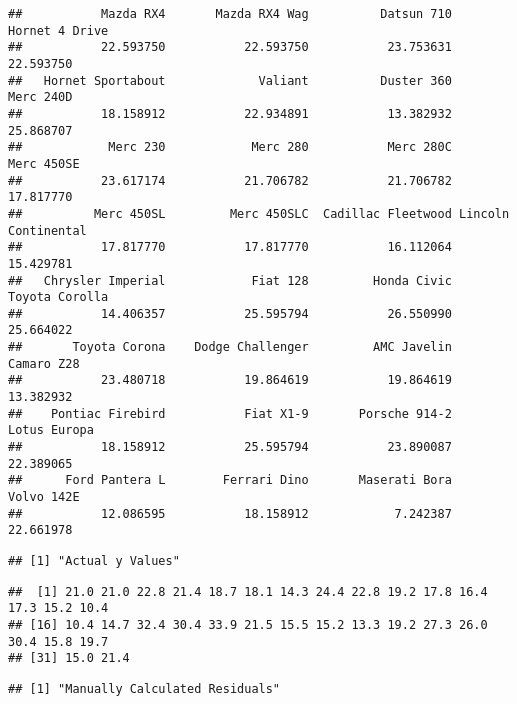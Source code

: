 \documentclass[
]{book}
\theoremstyle{definition}
\theoremstyle{definition}
\theoremstyle{definition}
\theoremstyle{definition}
\theoremstyle{remark}
\begin{document}
\begin{verbatim}
##           Mazda RX4       Mazda RX4 Wag          Datsun 710      Hornet 4 Drive 
##           22.593750           22.593750           23.753631           22.593750 
##   Hornet Sportabout             Valiant          Duster 360           Merc 240D 
##           18.158912           22.934891           13.382932           25.868707 
##            Merc 230            Merc 280           Merc 280C          Merc 450SE 
##           23.617174           21.706782           21.706782           17.817770 
##          Merc 450SL         Merc 450SLC  Cadillac Fleetwood Lincoln Continental 
##           17.817770           17.817770           16.112064           15.429781 
##   Chrysler Imperial            Fiat 128         Honda Civic      Toyota Corolla 
##           14.406357           25.595794           26.550990           25.664022 
##       Toyota Corona    Dodge Challenger         AMC Javelin          Camaro Z28 
##           23.480718           19.864619           19.864619           13.382932 
##    Pontiac Firebird           Fiat X1-9       Porsche 914-2        Lotus Europa 
##           18.158912           25.595794           23.890087           22.389065 
##      Ford Pantera L        Ferrari Dino       Maserati Bora          Volvo 142E 
##           12.086595           18.158912            7.242387           22.661978
\end{verbatim}

\begin{verbatim}
## [1] "Actual y Values"
\end{verbatim}

\begin{verbatim}
##  [1] 21.0 21.0 22.8 21.4 18.7 18.1 14.3 24.4 22.8 19.2 17.8 16.4 17.3 15.2 10.4
## [16] 10.4 14.7 32.4 30.4 33.9 21.5 15.5 15.2 13.3 19.2 27.3 26.0 30.4 15.8 19.7
## [31] 15.0 21.4
\end{verbatim}

\begin{verbatim}
## [1] "Manually Calculated Residuals"
\end{verbatim}
\end{document}
